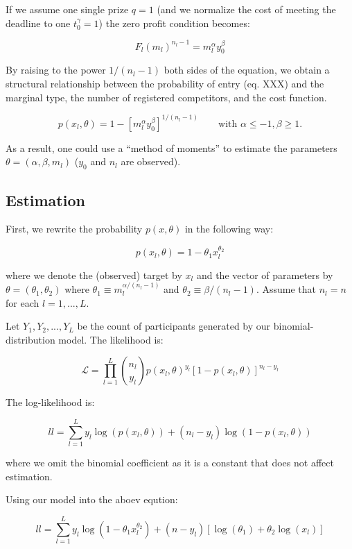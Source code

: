 \documentclass[]{article}
\begin{document}
If we assume one single prize \(q=1\) (and we normalize the cost of
meeting the deadline to one \(t_0^\gamma=1\)) the zero profit condition
becomes:

\begin{equation}
    F_l(m_l)^{n_l-1} = m_l^\alpha y_0^\beta 
\end{equation}

By raising to the power \(1/(n_l-1)\) both sides of the equation, we
obtain a structural relationship between the probability of entry (eq.
XXX) and the marginal type, the number of registered competitors, and
the cost function.

\[
    p(x_l, \theta) = 1 - \left[m_l^\alpha y_0^\beta \right]^{1/(n_l-1)} \qquad \text{with } \alpha\leq-1, \beta\geq1.
\]

As a result, one could use a ``method of moments'' to estimate the
parameters \(\theta=(\alpha, \beta, m_l)\) (\(y_0\) and \(n_l\) are
observed).

\subsection{Estimation}\label{estimation}

First, we rewrite the probability \(p(x, \theta)\) in the following way:

\[
    p(x_l, \theta) = 1 - \theta_1 x_l^{\theta_2}
\]

where we denote the (observed) target by \(x_l\) and the vector of
parameters by \(\theta=(\theta_1, \theta_2)\) where
\(\theta_1 \equiv m_l^{\alpha/(n_l-1)}\) and
\(\theta_2 \equiv \beta/(n_l-1)\). Assume that \(n_l=n\) for each
\(l=1,...,L\).

Let \(Y_1, Y_2, ..., Y_L\) be the count of participants generated by our
binomial-distribution model. The likelihood is:

\[
    \mathcal{L} = \prod_{l=1}^L \binom{n_l}{y_l} p(x_l, \theta)^{y_l} [1-p(x_l, \theta)]^{n_l - y_l}
\]

The log-likelihood is:

\[
        ll = \sum_{l=1}^L  y_l\log(p(x_l, \theta)) + (n_l - y_l) \log(1-p(x_l, \theta))
\]

where we omit the binomial coefficient as it is a constant that does not
affect estimation.

Using our model into the aboev eqution:

\[
    ll = \sum_{l=1}^L  y_l\log(1 - \theta_1 x_l^{\theta_2})
         + (n - y_l) [\log(\theta_1) +  \theta_2\log(x_l)]
\]
\end{document}
